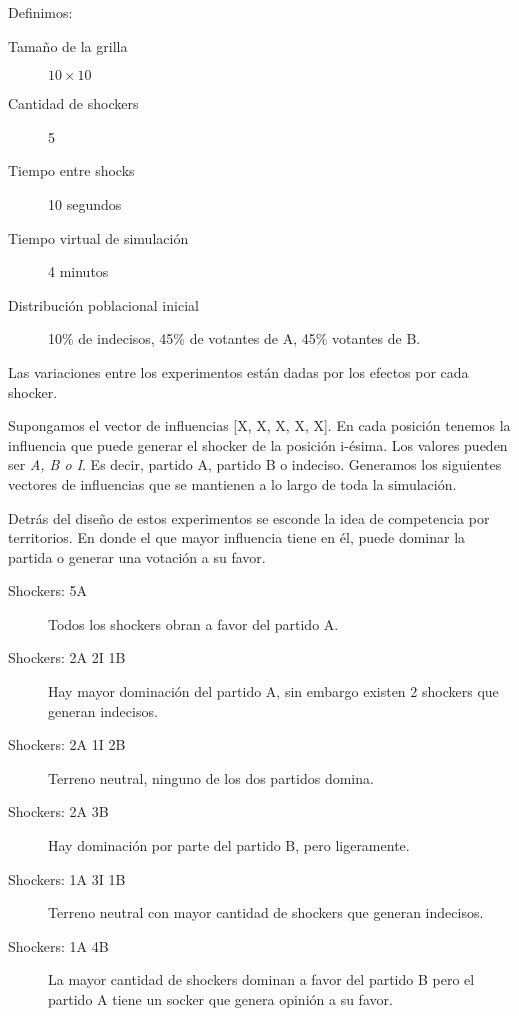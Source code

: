 Definimos:

\begin{description}
    \item[Tamaño de la grilla]  $10 \times 10$
    \item[Cantidad de shockers] 5
    \item[Tiempo entre shocks] 10 segundos
    \item[Tiempo virtual de simulación] 4 minutos
    \item[Distribución poblacional inicial] 10\% de indecisos, 45\% de votantes de A, 45\% votantes de B.
\end{description}

Las variaciones entre los experimentos están dadas por los efectos por cada shocker.

Supongamos el vector de influencias [X, X, X, X, X]. En cada posición tenemos la influencia que puede generar el shocker de la posición i-ésima. Los valores pueden ser \textit{A, B o I}. Es decir, partido A, partido B o indeciso. Generamos los siguientes vectores de influencias que se mantienen a lo largo de toda la simulación.

Detrás del diseño de estos experimentos se esconde la idea de competencia por territorios. En donde el que mayor influencia tiene en él, puede dominar la partida o generar una votación a su favor.

\begin{description}
    \item[Shockers: 5A] Todos los shockers obran a favor del partido A.
    \item[Shockers: 2A 2I 1B] Hay mayor dominación del partido A, sin embargo existen 2 shockers que generan indecisos.
    \item[Shockers: 2A 1I 2B] Terreno neutral, ninguno de los dos partidos domina.
    \item[Shockers: 2A 3B] Hay dominación por parte del partido B, pero ligeramente.
    \item[Shockers: 1A 3I 1B]Terreno neutral con mayor cantidad de shockers que generan indecisos.
    \item[Shockers: 1A 4B]La mayor cantidad de shockers dominan a favor del partido B pero el partido A tiene un socker que genera opinión a su favor.
    
\end{description}

